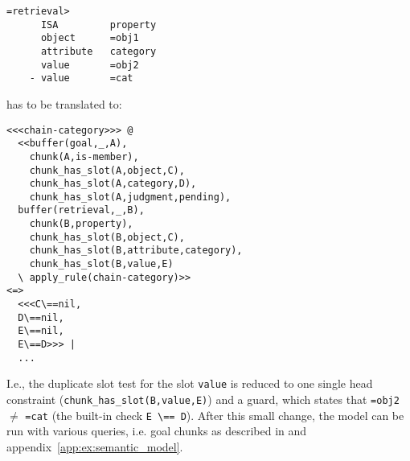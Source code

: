 \begin{lstlisting}
=retrieval>
      ISA         property
      object      =obj1
      attribute   category
      value       =obj2
    - value       =cat 
\end{lstlisting}

has to be translated to:

\begin{lstlisting}
<<<chain-category>>> @
  <<buffer(goal,_,A),
    chunk(A,is-member),
    chunk_has_slot(A,object,C),
    chunk_has_slot(A,category,D),
    chunk_has_slot(A,judgment,pending),
  buffer(retrieval,_,B),
    chunk(B,property),
    chunk_has_slot(B,object,C),
    chunk_has_slot(B,attribute,category),
    chunk_has_slot(B,value,E)
  \ apply_rule(chain-category)>>
<=> 
  <<<C\==nil,
  D\==nil,
  E\==nil,
  E\==D>>> |
  ...
\end{lstlisting}

I.e., the duplicate slot test for the slot \lstinline|value| is reduced to one single head constraint (\lstinline|chunk_has_slot(B,value,E)|) and a guard, which states that \lstinline|=obj2| $\neq$ \lstinline|=cat| (the built-in check \lstinline|E \== D|). After this small change, the model can be run with various queries, i.e. goal chunks as described in \cite[unit 1, pp. 24\psqq]{actr_tutorial} and appendix~\ref{app:ex:semantic_model}.



